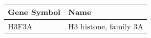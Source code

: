 \begin{tabular}{ll}
\toprule
Gene Symbol &                  Name \\
\midrule
      H3F3A & H3 histone, family 3A \\
\bottomrule
\end{tabular}

